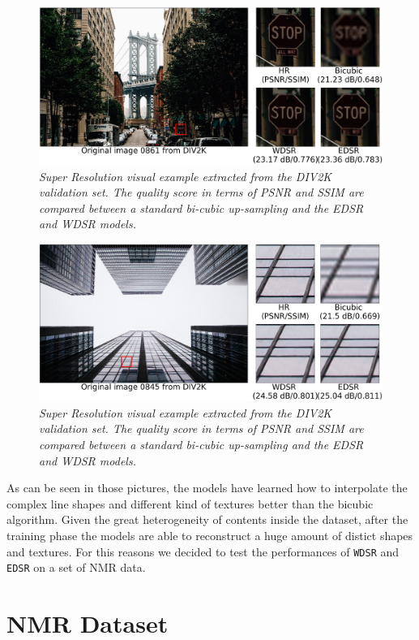 \documentclass[12pt,a4paper]{report}
\begin{document}
\begin{figure}[H]
  \includegraphics[scale=0.5]{images/sr_res2.png}
    \caption{\it Super Resolution visual example extracted from the DIV2K validation set. The quality score in terms of PSNR and SSIM are compared between a standard bi-cubic up-sampling and the EDSR and WDSR models.}
  \label{fig:city}
\end{figure}

\begin{figure}[H]
  \includegraphics[scale=0.5]{images/sr_res3.png}
  \caption{\it Super Resolution visual example extracted from the DIV2K validation set. The quality score in terms of PSNR and SSIM are compared between a standard bi-cubic up-sampling and the EDSR and WDSR models.}
  \label{fig:windows}
\end{figure}

As can be seen in those pictures, the models have learned how to interpolate the complex line shapes and different kind of textures better than the bicubic algorithm.
Given the great heterogeneity of contents inside the dataset, after the training phase the models are able to reconstruct a huge amount of distict shapes and textures. For this reasons we decided to test the performances of {\tt WDSR} and {\tt EDSR} on a set of NMR data. 

\section{NMR Dataset}
\end{document}
